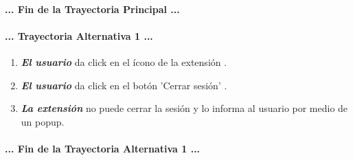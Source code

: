 \documentclass[12pt, a4paper, titlepage]{report}
\newcommand*{\img}[1]{%
    \raisebox{-.3\baselineskip}{%
        \texttt{[image: \#1]}%
    }%
}
\begin{document}
				\paragraph{... Fin de la Trayectoria Principal ...}
				
				\paragraph{... Trayectoria Alternativa 1 ...}
				\begin{enumerate}
				
					\item \textbf{\textit{El usuario}} da click en el ícono de la extensión \img{imagenes/Disenio/Componente_1/UI_icon_escom.png}.
					
					\item \textbf{\textit{El usuario}} da click en el botón 'Cerrar sesión' \img{imagenes/Disenio/Componente_1/UI_btn_logout.png}.
					
					\item \textbf{\textit{La extensión}} no puede cerrar la sesión y lo informa al usuario por medio de un popup.
					
				\end{enumerate}
				\paragraph{... Fin de la Trayectoria Alternativa 1 ...}
				\newpage
				
				
				
\end{document}
